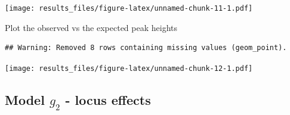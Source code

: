 \documentclass[]{article}
\newenvironment{Shaded}{\begin{snugshade}}{\end{snugshade}}
\newcommand{\DataTypeTok}[1]{\textcolor[rgb]{0.13,0.29,0.53}{#1}}
\newcommand{\DecValTok}[1]{\textcolor[rgb]{0.00,0.00,0.81}{#1}}
\newcommand{\KeywordTok}[1]{\textcolor[rgb]{0.13,0.29,0.53}{\textbf{#1}}}
\newcommand{\NormalTok}[1]{#1}
\newcommand{\OperatorTok}[1]{\textcolor[rgb]{0.81,0.36,0.00}{\textbf{#1}}}
\newcommand{\StringTok}[1]{\textcolor[rgb]{0.31,0.60,0.02}{#1}}
\begin{document}
\texttt{[image: results\_files/figure-latex/unnamed-chunk-11-1.pdf]}

Plot the observed vs the expected peak heights

\begin{Shaded}
\end{Shaded}

\begin{verbatim}
## Warning: Removed 8 rows containing missing values (geom_point).
\end{verbatim}

\texttt{[image: results\_files/figure-latex/unnamed-chunk-12-1.pdf]}

\hypertarget{model-g_2---locus-effects}{%
\subsection{\texorpdfstring{Model \(g_2\) - locus
effects}{Model g\_2 - locus effects}}\label{model-g_2---locus-effects}}
\end{document}
